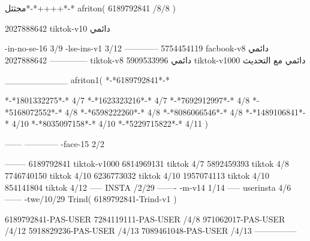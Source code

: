 مجثثل*-*++++*-*
afriton(
6189792841 /8/8
)

2027888642 tiktok-v10
دائمي

-in-no-se-16 3/9
-lse-ins-v1 3/12
------------
5754454119 facbook-v8
دائمي
--------------
2027888642 tiktok-v8
دائمي
5909533996 tiktok-v1000
دائمي مع التحديث

__________
afriton1(
*-*6189792841*-*

*-*1801332275*-* 4/7
*-*1623323216*-* 4/7
*-*7692912997*-* 4/8
*-*5168072552*-* 4/8
*-*6598222260*-* 4/8
*-*8086066546*-* 4/8
*-*1489106841*-* 4/10
*-*8035097158*-* 4/10
*-*5229715822*-* 4/11
)


------
------------
-face-15 2/2

--------
6189792841 tiktok-v1000
6814969131 tiktok 4/7
5892459393 tiktok 4/8
7746740150 tiktok 4/10
6236773032 tiktok 4/10
1957074113 tiktok 4/10
854141804 tiktok 4/12
-----
 INSTA /2/29
-------
-m-v14 1/14
-----
userinsta 4/6
------
-twe/10/29
Trind(
6189792841-Trind-v1 
)

6189792841-PAS-USER
7284119111-PAS-USER /4/8
971062017-PAS-USER /4/12
5918829236-PAS-USER /4/13
7089461048-PAS-USER /4/13
    ---------------
